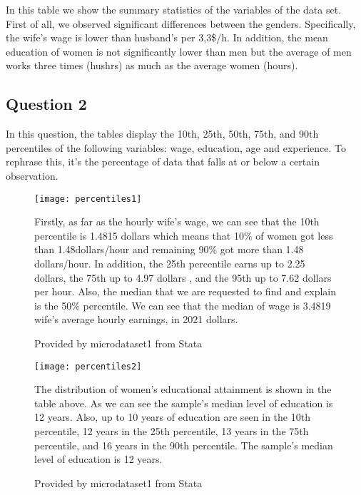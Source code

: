 \documentclass{article}
\begin{document}
	\vspace {0.5\baselineskip}
	
	In this table we show the summary statistics of the variables of the data set. First of all, we observed significant differences between the genders. Specifically, the wife’s wage is lower than husband’s per 3,3\$/h. In addition, the mean education of women is not significantly lower than men but the average of men works three times (hushrs) as much as the average women (hours).
	
	\vspace {0.5\baselineskip}
	
	\subsection{Question 2}
	
	\vspace {0.5\baselineskip}
	
	In this question, the tables display the 10th, 25th, 50th, 75th, and 90th percentiles of the following variables: wage, education, age and experience. To rephrase this, it’s the percentage of data that falls at or below a certain observation.
	
	\vspace {0.5\baselineskip}


\begin{figure}
	\begin{Center}
	\texttt{[image: percentiles1]}
	\caption{Provided by microdataset1 from Stata}
	\label{fig:percentiles1}
	\end{Center}
	\vspace {0.5\baselineskip}
	
	Firstly, as far as the hourly wife’s wage, we can see that the 10th percentile is 1.4815 dollars which means that 10\% of women got less than 1.48dollars/hour and remaining 90\% got more than 1.48 dollars/hour. In addition, the 25th percentile earns up to 2.25 dollars, the 75th up to 4.97 dollars , and the 95th up to 7.62 dollars per hour. Also, the median that we are requested to find and explain is the 50\% percentile. We can see that the median of  wage is 3.4819 wife’s average hourly earnings, in 2021 dollars.	
\end{figure}	
	\vspace {0.5\baselineskip}

\begin{figure}
	\begin{Center}
	\texttt{[image: percentiles2]}
	\caption{Provided by microdataset1 from Stata}
	\label{fig:percentiles2}
	\end{Center}
	\vspace {0.5\baselineskip}

	The distribution of women’s educational attainment is shown in the table above. As we can see the sample’s median level of education is 12 years. Also, up to 10 years of education are seen in the 10th percentile, 12 years in the 25th percentile, 13 years in the 75th percentile, and 16 years in the 90th percentile. The sample’s median level of education is 12 years. 
\end{figure}
	\vspace {0.5\baselineskip}
	
\end{document}
